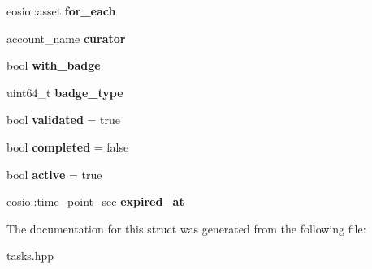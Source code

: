 \begin{DoxyCompactItemize}
eosio\+::asset {\bfseries for\+\_\+each}
\item 
\mbox{\label{structeosio_1_1tasks_abb9d1521a06fc001bca33e16d2b56216}} 
account\+\_\+name {\bfseries curator}
\item 
\mbox{\label{structeosio_1_1tasks_afb737cb041602c31f6e8e3c7e7b1e1ff}} 
bool {\bfseries with\+\_\+badge}
\item 
\mbox{\label{structeosio_1_1tasks_a98f9d53abf632a0434791219fb22e703}} 
uint64\+\_\+t {\bfseries badge\+\_\+type}
\item 
\mbox{\label{structeosio_1_1tasks_a34d2a47f4dc46e037219a39bdd15ffe9}} 
bool {\bfseries validated} = true
\item 
\mbox{\label{structeosio_1_1tasks_a44c0c88771203aac5874adc54760364f}} 
bool {\bfseries completed} = false
\item 
\mbox{\label{structeosio_1_1tasks_a9ebe943aff0ed52a7b838608f9200324}} 
bool {\bfseries active} = true
\item 
\mbox{\label{structeosio_1_1tasks_ab13c4604e989f4f930e04c13e63cadbf}} 
eosio\+::time\+\_\+point\+\_\+sec {\bfseries expired\+\_\+at}
\end{DoxyCompactItemize}


The documentation for this struct was generated from the following file\+:\begin{DoxyCompactItemize}
\item 
tasks.\+hpp\end{DoxyCompactItemize}
